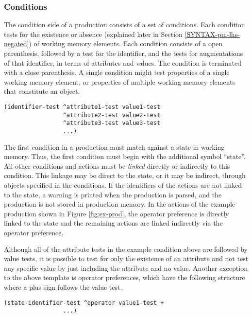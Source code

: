 \subsubsection{Conditions}
\label{SYNTAX-pm-lhs-conditions}

The condition side of a production consists of a set of conditions. Each condition tests for the existence or absence (explained later in Section \ref{SYNTAX-pm-lhs-negated}) of working memory elements. Each condition consists of a open parenthesis, followed by a test for the identifier, and the tests for augmentations of that identifier, in terms of attributes and values.  The condition is terminated with a close parenthesis. A single condition might test properties of a single working memory element, or properties of multiple working memory elements that constitute an object.

\begin{verbatim}
(identifier-test ^attribute1-test value1-test 
                 ^attribute2-test value2-test
                 ^attribute3-test value3-test
                 ...)
\end{verbatim}

The first condition in a production must match against a state in working memory.  Thus, the first condition must begin with the additional symbol ``state''.  All other conditions and actions must be \textit{linked} directly or indirectly to this condition. This linkage may be direct to the state, or it may be indirect, through objects specified in the conditions.  If the identifiers of the actions are not linked to the state, a warning is printed when the production is parsed, and the production is not stored in production memory.  In the actions of the example production shown in Figure \ref{fig:ex-prod}, the operator preference is directly linked to the state and the remaining actions are linked indirectly via the operator preference.

Although all of the attribute tests in the example condition above are followed by value tests, it is possible to test for only the existence of an attribute and not test any specific value by just including the attribute and no value.  Another exception to the above template is operator preferences, which have the following structure where a plus sign follows the value test.

\begin{verbatim}
(state-identifier-test ^operator value1-test +
                 ...)
\end{verbatim}

